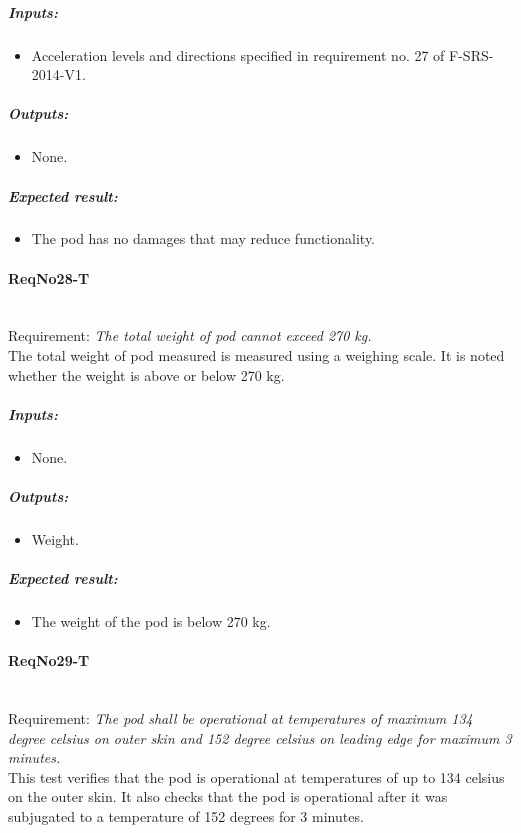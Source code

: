 	\subparagraph{Inputs:}
	\begin{itemize}
	\item Acceleration levels and directions specified in requirement no. 27 of F-SRS-2014-V1.
	\end{itemize}
	\subparagraph{Outputs:}
	\begin{itemize}
	\item None.
	\end{itemize}
	\subparagraph{Expected result:}
	\begin{itemize}
	\item The pod has no damages that may reduce functionality.
	\end{itemize}


\paragraph{ReqNo28-T}\mbox{}\\ %
Requirement: \textit{The total weight of pod cannot exceed 270 kg.}
\\
The total weight of pod measured is measured using a weighing scale. It is noted whether the weight is above or below 270 kg.
\\
	\subparagraph{Inputs:}
	\begin{itemize}
	\item None.
	\end{itemize}
	\subparagraph{Outputs:}
	\begin{itemize}
	\item Weight.
	\end{itemize}
	\subparagraph{Expected result:}
	\begin{itemize}
	\item The weight of the pod is below 270 kg.
	\end{itemize}

\paragraph{ReqNo29-T}\mbox{}\\ %
Requirement: \textit{The pod shall be operational at temperatures of maximum 134 degree celsius on outer skin and 152 degree celsius on leading edge for maximum 3 minutes.}
\\
This test verifies that the pod is operational at temperatures of up to 134 celsius on the outer skin. It also checks that the pod is operational after it was subjugated to a temperature of 152 degrees for 3 minutes.
\\

